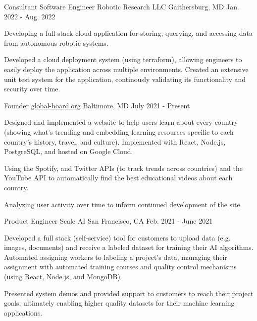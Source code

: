 
\begin{cventries}
  \cventry
    {Consultant Software Engineer} %
    {Robotic Research LLC} %
    {Gaithersburg, MD} %
    {Jan. 2022 - Aug. 2022} %
    {
      \begin{cvitems} %
        \item {Developing a full-stack cloud application for storing, querying, and accessing data from autonomous robotic systems.}
        \item {Developed a cloud deployment system (using terraform), allowing engineers to easily deploy the application across multiple environments.
          Created an extensive unit test system for the application, continously validating its functionality and security over time.
        }
      \end{cvitems}
    }

  \cventry
    {Founder} %
    {\href{https://global-board.org}{global-board.org}} %
    {Baltimore, MD} %
    {July 2021 - Present} %
    {
      \begin{cvitems} %
        \item {Designed and implemented a website to help users learn about every country (showing what's trending and embedding learning resources specific to each country's history, travel, and culture).  Implemented with React, Node.js, PostgreSQL, and hosted on Google Cloud.}
        \item {Using the Spotify, and Twitter APIs (to track trends across countries) and the YouTube API to automatically find the best educational videos about each country.}
        \item {Analyzing user activity over time to inform continued development of the site.}
      \end{cvitems}
    }

  \cventry
    {Product Engineer} %
    {Scale AI} %
    {San Francisco, CA} %
    {Feb. 2021 - June 2021} %
    {
      \begin{cvitems} %
        \item {Developed a full stack (self-service) tool for customers to upload data (e.g. images, documents) and receive a labeled dataset for training their AI algorithms.  Automated assigning workers to labeling a project's data, managing their assignment with automated training courses and quality control mechanisms (using React, Node.js, and MongoDB).}
        \item {Presented system demos and provided support to customers to reach their project goals; ultimately enabling higher quality datasets for their machine learning applications.}
      \end{cvitems}
    }


\end{cventries}
